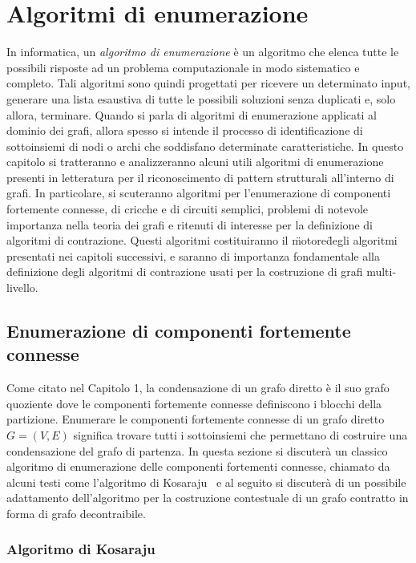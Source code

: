 \chapter{Algoritmi di enumerazione}

In informatica, un \textit{algoritmo di enumerazione} \`e un algoritmo che elenca tutte le possibili risposte ad un
problema computazionale in modo sistematico e completo. Tali algoritmi sono quindi progettati per ricevere un
determinato input, generare una lista esaustiva di tutte le possibili soluzioni senza duplicati e, solo allora,
terminare.
Quando si parla di algoritmi di enumerazione applicati al dominio dei grafi, allora spesso si intende il processo di
identificazione di sottoinsiemi di nodi o archi che soddisfano determinate caratteristiche.
In questo capitolo si tratteranno e analizzeranno alcuni utili algoritmi di enumerazione presenti in letteratura per
il riconoscimento di pattern strutturali all'interno di grafi. In particolare, si scuteranno algoritmi per l'enumerazione
di componenti fortemente connesse, di cricche e di circuiti semplici, problemi di notevole importanza nella teoria dei
grafi e ritenuti di interesse per la definizione di algoritmi di contrazione.
Questi algoritmi costituiranno il \"motore\" degli algoritmi presentati nei capitoli successivi, e saranno di
importanza fondamentale alla definizione degli algoritmi di contrazione usati per la costruzione di grafi multi-livello.

\section{Enumerazione di componenti fortemente connesse}\label{subsec:enumerazione-di-componenti-fortemente-connesse}

Come citato nel Capitolo 1, la condensazione di un grafo diretto \`e il suo grafo quoziente dove le componenti
fortemente connesse definiscono i blocchi della partizione.
Enumerare le componenti fortemente connesse di un grafo diretto $G = (V, E)$ significa trovare tutti i sottoinsiemi
che permettano di costruire una condensazione del grafo di partenza.
In questa sezione si discuter\`a un classico algoritmo di enumerazione delle componenti fortementi connesse, chiamato
da alcuni testi come l'algoritmo di Kosaraju~\cite{SHARIR198167} e al seguito si discuter\`a di un possibile adattamento
dell'algoritmo per la costruzione contestuale di un grafo contratto in forma di grafo decontraibile.

\subsection{Algoritmo di Kosaraju}\label{subsec:algoritmo-di-kosaraju}

